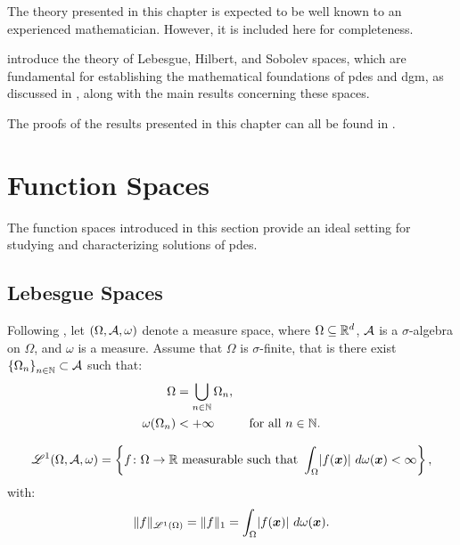 The theory presented in this chapter is expected to be well known to an experienced mathematician. However, it is included here for completeness.

 introduce the theory of Lebesgue, Hilbert, and Sobolev spaces, which are fundamental for establishing the mathematical foundations of \acrshort{pdes} and \acrshort{dgm}, as discussed in , along with the main results concerning these spaces.

The proofs of the results presented in this chapter can all be found in .

\newpage
\section{Function Spaces}

The function spaces introduced in this section provide an ideal setting for studying and characterizing solutions of \acrshort{pdes}.

\subsection{Lebesgue Spaces} \label{subsection:lebesgue}

Following \cite[p.~89]{Brezis2010}, let $(\Omega, \mathcal{A}, \omega)$ denote a measure space, where $\Omega \subseteq \mathbb{R}^{d}$, $\mathcal{A}$ is a $\sigma$-algebra on $\Omega$, and $\omega$ is a measure. Assume that $\Omega$ is $\sigma$-finite, that is there exist $\left\{ \Omega_n \right\}_{n \in \mathbb{N}} \subset \mathcal{A}$ such that:
\begin{align}
    \Omega & = \bigcup_{n \in \mathbb{N}} \Omega_n, \\
    \omega(\Omega_n) & < +\infty &\text{ for all } n \in \mathbb{N}.
\end{align}

\begin{definition}
    \begin{align}
        \mathscr{L}^{1}(\Omega, \mathcal{A}, \omega) = \left\{ f \colon \Omega \rightarrow \mathbb{R} \text{ measurable such that } \int_{\Omega} \lvert f(\bm{x}) \rvert ~ d \omega(\bm{x}) < \infty \right\},
    \end{align}
    with:
    \begin{align}
    \lVert f \rVert_{\mathscr{L}^{1}(\Omega)} = \lVert f \rVert_{1} = \int_{\Omega} \lvert f(\bm{x}) \rvert ~ d \omega(\bm{x}).
    \end{align}
\end{definition}

